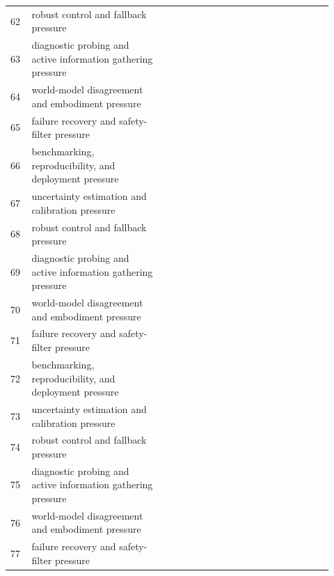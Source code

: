 \documentclass[11pt]{article}
\begin{document}
\begin{longtable}{p{0.06\linewidth}p{0.38\linewidth}p{0.48\linewidth}}
62 & robust control and fallback pressure & \citep{kimmel1996robotgenerated184,islam2024future185,jhaveri2022a186} \\
63 & diagnostic probing and active information gathering pressure & \citep{shah2022evaluation187,niu2022noise188,dong2025efficacy189} \\
64 & world-model disagreement and embodiment pressure & \citep{dehankar2025demystifying190,firouzi2021harnessing191,sakhamuri2025aiopsdriven192} \\
65 & failure recovery and safety-filter pressure & \citep{ansari2021a193,wang2023a194,gu2024deep195} \\
66 & benchmarking, reproducibility, and deployment pressure & \citep{abdulhae2022clusterbased196,adamkiewicz2022visiononly197,zhang2024extract198} \\
67 & uncertainty estimation and calibration pressure & \citep{francisco2023ai199,seo2024solving200,yigitcanlar2024unlocking201} \\
68 & robust control and fallback pressure & \citep{hao2023reasoning202,wu2025construction203,shakil2026explainable204} \\
69 & diagnostic probing and active information gathering pressure & \citep{miao2026mdf205,bank2018world206,fu2024drivegenvlm207} \\
70 & world-model disagreement and embodiment pressure & \citep{chen2024attmoe208,gervet2023navigating209,mei2023roboticassisted210} \\
71 & failure recovery and safety-filter pressure & \citep{fu2025realworld211,velayudhan2025stingbee212,lansky2022reinforcement213} \\
72 & benchmarking, reproducibility, and deployment pressure & \citep{rizvi2023realworld214,antonioni2022learning215,alindmethods216} \\
73 & uncertainty estimation and calibration pressure & \citep{xu2023extended217,ramezani2023scalability218,schjdt2025realworld219} \\
74 & robust control and fallback pressure & \citep{zohar2023prob220,vaquero2024eels221,silva2021a222} \\
75 & diagnostic probing and active information gathering pressure & \citep{kawaharazuka2024realworld223,ji2020an224,nygaard2020real225} \\
76 & world-model disagreement and embodiment pressure & \citep{zhang2025mirsam226,jovanovic2021twodimensional227,calli2021guest228} \\
77 & failure recovery and safety-filter pressure & \citep{yang2024regionplc229,gong2021a230} \\
\bottomrule
\end{longtable}



\end{document}
